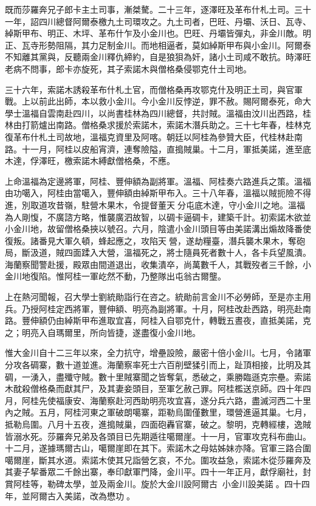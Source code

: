 \begin{pinyinscope}
既而莎羅奔兄子郎卡主土司事，漸桀驁。二十三年，逐澤旺及革布什札土司。三十一年，詔四川總督阿爾泰檄九土司環攻之。九土司者，巴旺、丹壩、沃日、瓦寺、綽斯甲布、明正、木坪、革布什乍及小金川也。巴旺、丹壩皆彈丸，非金川敵。明正、瓦寺形勢阻隔，其力足制金川。而地相逼者，莫如綽斯甲布與小金川。阿爾泰不知離其黨與，反聽兩金川釋仇締約，自是狼狽為奸，諸小土司咸不敢抗。時澤旺老病不問事，郎卡亦旋死，其子索諾木與僧格桑侵鄂克什土司地。

三十六年，索諾木誘殺革布什札土官，而僧格桑再攻鄂克什及明正土司，與官軍戰。上以前此出師，本以救小金川。今小金川反悖逆，罪不赦。賜阿爾泰死，命大學士溫福自雲南赴四川，以尚書桂林為四川總督，共討賊。溫福由汶川出西路，桂林由打箭爐出南路。僧格桑求援於索諾木，索諾木潛兵助之。三十七年春，桂林克復革布什札土司故地，溫福克資里及阿喀。朝廷以阿桂為參贊大臣，代桂林赴南路。十一月，阿桂以皮船宵濟，連奪險隘，直搗賊巢。十二月，軍抵美諾，進至底木達，俘澤旺，檄索諾木縛獻僧格桑，不應。

上命溫福為定邊將軍，阿桂、豐伸額為副將軍。溫福、阿桂奏六路進兵之策。溫福由功噶入，阿桂由當噶入，豐伸額由綽斯甲布入。三十八年春，溫福以賊扼險不得進，別取道攻昔嶺，駐營木果木，令提督董天分屯底木達，守小金川之地。溫福為人剛愎，不廣諮方略，惟襲廣泗故智，以碉卡逼碉卡，建築千計。初索諾木欲並小金川地，故留僧格桑挾以號召。六月，陰遣小金川頭目等由美諾溝出煽故降番使復叛。諸番見大軍久頓，蜂起應之，攻陷天營，遂劫糧臺，潛兵襲木果木，奪砲局，斷汲道，賊四面蹂入大營，溫福死之，將士隨員死者數十人，各卡兵望風潰。海蘭察聞警赴援，殿眾由間道退出，收集潰卒，尚萬數千人，其戰歿者三千餘，小金川地復陷。惟阿桂一軍屹然不動，乃整隊出屯翁古爾壟。

上在熱河聞報，召大學士劉統勛詣行在咨之。統勛前言金川不必勞師，至是亦主用兵。乃授阿桂定西將軍，豐伸額、明亮為副將軍。十月，阿桂改赴西路，明亮赴南路。豐伸額仍由綽斯甲布進取宜喜，阿桂入自鄂克什，轉戰五晝夜，直抵美諾，克之；明亮入自瑪爾里，所向皆捷，遂盡復小金川地。

惟大金川自十二三年以來，全力抗守，增壘設險，嚴密十倍小金川。七月，令諸軍分攻各碉寨，數十道並進。海蘭察率死士六百削壁猱引而上，趾頂相接，比明及其碉，一湧入，盡殲守賊。數十里賊寨聞之皆奪氣，悉破之，乘勝臨遜克宗壘。索諾木酖殺僧格桑而獻其尸，及其妻妾頭目，至軍乞赦己罪。阿桂檻送京師。四十年四月，阿桂先使福康安、海蘭察赴河西助明亮攻宜喜，遂分兵六路，盡滅河西二十里內之賊。五月，阿桂河東之軍破朗噶寨，距勒烏圍僅數里，環營進逼其巢。七月，抵勒烏圍。八月十五夜，進搗賊巢，四面砲轟官寨，破之。黎明，克轉經樓，逸賊皆溺水死。莎羅奔兄弟及各頭目已先期遁往噶爾崖。十一月，官軍攻克科布曲山。十二月，遂據瑪爾古山，噶爾崖即在其下。索諾木之母姑姊妹亦降。官軍三路合圍噶爾崖，斷其水道。索諾木使其兄詣營乞哀，不允。圍攻益急，索諾木從莎羅奔及其妻子挈番眾二千餘出寨，奉印獻軍門降，金川平。四十一年正月，獻俘廟社，封賞阿桂等，勒碑太學，並及兩金川。旋於大金川設阿爾古，小金川設美諾。四十四年，並阿爾古入美諾，改為懋功。


\end{pinyinscope}
